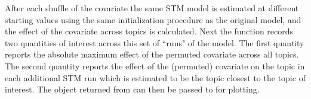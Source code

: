 \documentclass[article,shortnames]{jss}
\begin{document}
After each shuffle of the covariate the same STM model is estimated at different starting values using the same initialization procedure as the original model, and the effect of the covariate across topics is calculated.
Next the function records two quantities of interest across this set of ``runs" of the model. The first quantity reports the absolute maximum effect of the permuted covariate across all topics.
The second quantity reports the effect of the (permuted) covariate on the topic in each additional STM run which is estimated to be the topic closest to the topic of interest. The object returned from  can then be passed to  for plotting.




\clearpage
{}

\end{document}
